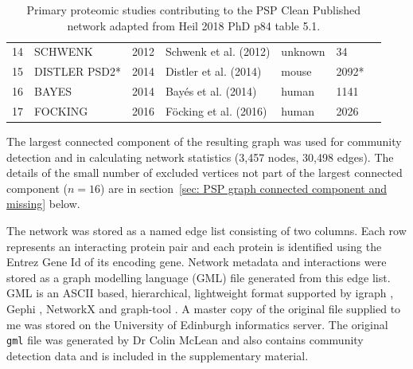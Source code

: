 \begin{table}[]
\begin{tabular}{lllllll}
14&SCHWENK&2012&Schwenk et al. (2012)\cite{schwenk2012high}   &unknown &34\\
15&DISTLER PSD2*&2014&Distler et al. (2014)\cite{distler2014depth} & mouse& 2092*\\
16&BAYES&2014&Bayés et al. (2014) \cite{bayes2014human} & human &1141\\
 17&FOCKING&2016&Föcking et al. (2016)\cite{focking2016proteomic}& human &2026\\

\bottomrule
    \end{tabular}
    \caption[Primary Proteomic studies contributing to the PSP - from Heil (2018)]{Primary proteomic studies contributing to the PSP Clean Published network adapted from Heil 2018\cite{heil2018systems} PhD p84 table 5.1. }
    \label{tab:Katharina_phd_studies_oksana_studies}
\end{table}




 


 
  




 
 
The largest connected component of the resulting graph was used for community detection and in calculating network statistics (3,457 nodes, 30,498 edges). The details of the small number of excluded vertices not part of the largest connected component ($n=16$) are in section~\ref{sec: PSP graph connected component and missing} below.

The network was stored as a named edge list consisting of two columns. Each row represents an interacting protein pair and each protein is identified using the Entrez Gene Id of its encoding gene. Network metadata and interactions were stored as a graph modelling language (GML) file generated from this edge list\cite{himsolt1997gml}. 
GML is an ASCII based, hierarchical, lightweight format supported by igraph \cite{csardi2006igraph}, Gephi \cite{bastian2009gephi} , NetworkX \cite{hagberg2008exploring} and graph-tool \cite{peixoto_graph-tool_2014}.  A master copy of the original file supplied to me was stored on the University of Edinburgh informatics server. The original \texttt{gml} file was generated by Dr Colin McLean and also contains community detection data and is included in the supplementary material.

